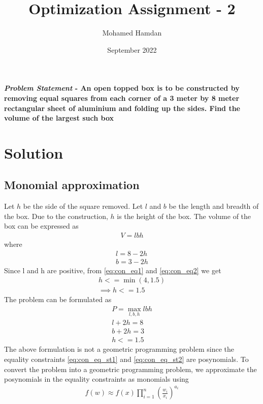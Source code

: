 \documentclass[journal,10pt,twocolumn]{article}
\title{\textbf{Optimization Assignment - 2}}
\author{Mohamed Hamdan}
\date{September 2022}
\providecommand{\brak}[1]{\ensuremath{\left(#1\right)}}
\begin{document}
\maketitle
\paragraph{\textit{Problem Statement} - An open topped box is to be constructed by removing equal squares from each corner of a 3 meter by 8 meter rectangular sheet of aluminium and folding up the sides. Find the volume of the largest such box}

\section*{\large Solution}
\subsection*{\normalsize Monomial approximation}
Let $h$ be the side of the square removed. Let $l$ and $b$ be the length and breadth of the box. Due to the construction, $h$ is the height of the box. The volume of the box can be expressed as
\begin{align}
	V = lbh
\end{align}
where
\begin{align}
	\label{eq:con_eq1}
	l = 8 - 2h\\
	\label{eq:con_eq2}
	b = 3 - 2h
\end{align}
Since l and h are positive, from \eqref{eq:con_eq1} and \eqref{eq:con_eq2} we get
\begin{align}
	h <= \min(4, 1.5)\\
	\implies h <= 1.5
	\label{eq:lt_eq1}
\end{align}
The problem can be formulated as
\begin{align}
	\label{eq:prob_std}
	P = \max_{l,b,h}lbh\\
	\label{eq:con_eq_st1}
	l + 2h = 8\\
	\label{eq:con_eq_st2}
	b + 2h = 3\\
	\label{eq:lt_eq_std}
	h <= 1.5
\end{align}
The above formulation is not a geometric programming problem since the equality constraints \eqref{eq:con_eq_st1} and \eqref{eq:con_eq_st2} are posynomials. To convert the problem into a geometric programming problem, we approximate the posynomials in the equality constraints as monomials using
\begin{align}
	\label{eq:mono_approx}
	f(w) \approx f(x)\prod_{i=1}^{n}\brak{\frac{w_i}{x_i}}^{a_i}
\end{align}
\end{document}
